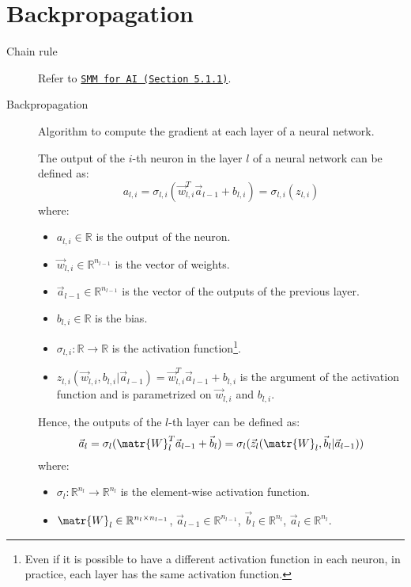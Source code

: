


\section{Backpropagation}

\begin{description}
    \item[Chain rule] 
        Refer to \href{\gitSMM{}}{\texttt{SMM for AI (Section 5.1.1)}}.
    
    \item[Backpropagation] 
        Algorithm to compute the gradient at each layer of a neural network.

        The output of the $i$-th neuron in the layer $l$ of a neural network can be defined as:
        \[ a_{l,i} = \sigma_{l,i}( \vec{w}_{l,i}^T \vec{a}_{l-1} + b_{l,i} ) = \sigma_{l,i}(z_{l,i})\]
        where:
        \begin{itemize}
            \item $a_{l,i} \in \mathbb{R}$ is the output of the neuron.
            \item $\vec{w}_{l,i} \in \mathbb{R}^{n_{l-1}}$ is the vector of weights.
            \item $\vec{a}_{l-1} \in \mathbb{R}^{n_{l-1}}$ is the vector of the outputs of the previous layer.
            \item $b_{l,i} \in \mathbb{R}$ is the bias.
            \item $\sigma_{l,i}: \mathbb{R} \rightarrow \mathbb{R}$ is the activation function\footnote{Even if it is possible to have a different activation function in each neuron, in practice, each layer has the same activation function.}.
            \item $z_{l,i}(\vec{w}_{l,i}, b_{l,i} | \vec{a}_{l-1}) = \vec{w}_{l,i}^T \vec{a}_{l-1} + b_{l,i}$ is the argument of the activation function and is parametrized on $\vec{w}_{l,i}$ and $b_{l,i}$.
        \end{itemize}

        Hence, the outputs of the $l$-th layer can be defined as:
        \[ \vec{a}_l = \sigma_l( \matr{W}_l^T \vec{a}_{l-1} + \vec{b}_l ) = \sigma_l( \vec{z}_l(\matr{W}_l, \vec{b}_l | \vec{a}_{l-1}) ) \]
        where: 
        \begin{itemize}
            \item $\sigma_l: \mathbb{R}^{n_l} \rightarrow \mathbb{R}^{n_l}$ is the element-wise activation function.
            \item 
                $\matr{W}_l \in \mathbb{R}^{n_l \times n_{l-1}}$, 
                $\vec{a}_{l-1} \in \mathbb{R}^{n_{l-1}}$,
                $\vec{b}_l \in \mathbb{R}^{n_l}$,
                $\vec{a}_l \in \mathbb{R}^{n_l}$.
        \end{itemize}


\end{description}
